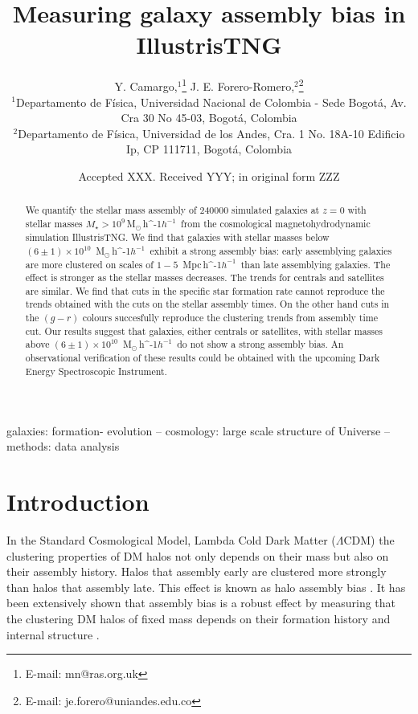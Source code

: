 \documentclass[fleqn,usenatbib]{mnras}
\title[Galaxy Assembly Bias]{Measuring galaxy assembly bias in IllustrisTNG}
\author[Camargo, Y. \& Forero-Romero J. E.]{
Y. Camargo,$^{1}$\thanks{E-mail: mn@ras.org.uk}
J. E. Forero-Romero,$^{2}$\thanks{E-mail: je.forero@uniandes.edu.co}
\\
$^{1}$Departamento de F\'isica, Universidad Nacional de Colombia - Sede Bogot\'a, Av. Cra 30 No 45-03, Bogot\'a, Colombia\\
$^{2}$Departamento de F\'isica, Universidad de los Andes, Cra. 1 No. 18A-10 Edificio Ip, CP 111711, Bogot\'a, Colombia\\
}
\date{Accepted XXX. Received YYY; in original form ZZZ}
\newcommand{\Msunh}{\,{\rm M}$_{\odot}$\,\ifmmode h^{-1}\else $h^{-1}$\fi}
\newcommand{\Mpch}{\,{\rm Mpc}\,\ifmmode h^{-1}\else $h^{-1}$\fi}
\begin{document}
\label{firstpage}
\pagerange{\pageref{firstpage}--\pageref{lastpage}}
\maketitle

\begin{abstract}
We quantify the stellar mass assembly of 240000 simulated galaxies
at $z=0$ with stellar masses $M_{\star} > 10^{9}$\Msunh\ 
from the cosmological magnetohydrodynamic simulation IllustrisTNG. 
We find that galaxies with stellar masses below $(6\pm 1)\times
10^{10}$ \Msunh\ exhibit a strong assembly bias: early
assemblying galaxies are more clustered on scales of $1-5$ \Mpch\ than
late assemblying galaxies. The effect is stronger as the stellar
masses decreases.
The trends for centrals and satellites are similar. 
We find that cuts in the specific star formation rate cannot reproduce
the trends obtained with the cuts on the stellar assembly times.
On the other hand cuts in the $(g-r)$ colours succesfully reproduce
the clustering trends from assembly time cut.  
Our results suggest that galaxies, either centrals or satellites, with
stellar masses above $(6\pm 1)\times 10^{10}$ \Msunh\ do not show a
strong assembly bias.    
An observational verification of these results could be obtained with
the upcoming Dark Energy Spectroscopic Instrument.
\end{abstract}

\begin{keywords}
galaxies: formation- evolution -- cosmology: large scale structure of Universe -- methods: data analysis
\end{keywords}



\section{Introduction}
In the Standard Cosmological Model, Lambda Cold Dark Matter
($\Lambda$CDM) the clustering properties of DM halos not only depends on their mass
but also on their assembly history.
Halos that assembly early are clustered more strongly
than halos that assembly late.
This effect is known as halo assembly bias \citep{2005MNRAS.363L..66G}.
It has been extensively shown  that
assembly bias is a robust effect
by measuring that the clustering DM halos of fixed mass depends on their formation history and internal structure \citep{2006ApJ...652...71W,2008ApJ...687...12D}.
\end{document}
